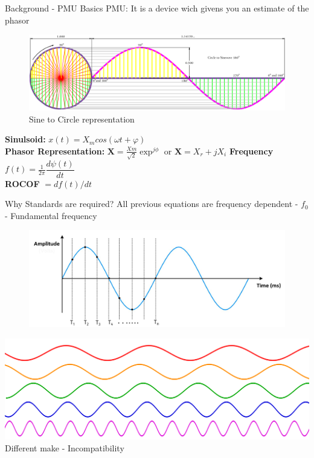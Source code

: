 \documentclass{beamer}
\begin{document}
   \begin{frame}{Background - PMU Basics}
   PMU: It is a device wich givens you an estimate of the phasor 
   \begin{figure}
   \includegraphics*[scale = 0.2]{Circle-To-Sine-Wave.png}
   \caption{Sine to Circle representation \cite{site:westau}}
   \end{figure}

   \textbf{Sinulsoid:} \textbf{$x(t) = X_m cos(\omega t + \varphi)$} \\
	\textbf{Phasor Representation:} $\textbf{X} = \frac{Xm}{\sqrt{2}}\exp^{j\phi} $ or $\textbf{X} = X_r+jX_i$
	\textbf{Frequency} $f(t) = \frac{1}{2\pi} \dfrac{d\psi(t)}{dt}$\\
	\textbf{ROCOF} $= df(t)/dt$
   
   \end{frame}

\begin{frame}{Why Standards are required?}
\centering
All previous equations are frequency dependent - $f_0$ - Fundamental frequency
\begin{figure}
\includegraphics[scale=0.2]{sine_sampled.png} \\
\end{figure}
\pause
\includegraphics[scale=0.1]{multisine.png}
Different make - Incompatibility 
\end{frame}
   
\end{document}
